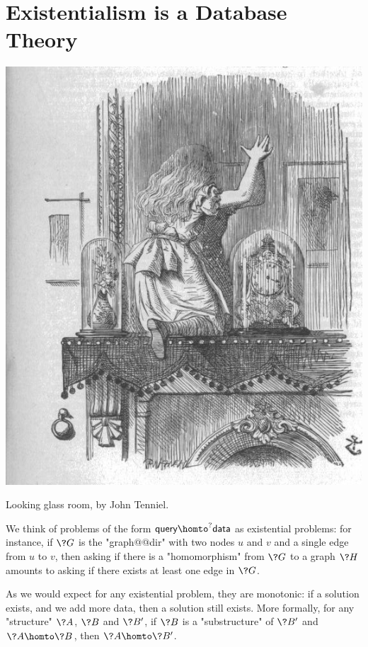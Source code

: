 \section{Existentialism is a Database Theory}

\begin{marginfigure}
	\centering
	\includegraphics[width=\linewidth]{fig/intro/aliceroom.jpg}
	\caption{Looking glass room, by John Tenniel.}
\end{marginfigure}

We think of problems of the form $\textsf{query} \homto^? \textsf{data}$
as existential problems: for instance, if $\?G$ is the "graph@@dir" with
two nodes $u$ and $v$ and a single edge from $u$ to $v$,
then asking if there is a "homomorphism" from $\?G$ to a graph $\?H$ amounts
to asking if there exists at least one edge in $\?G$.

As we would expect for any existential problem, they are monotonic:
if a solution exists, and we add more data, then a solution still exists.
More formally, for any "structure" $\?A$, $\?B$ and $\?B'$, if $\?B$ is a "substructure"
of $\?B'$ and $\?A \homto \?B$,
then $\?A \homto \?B'$.

